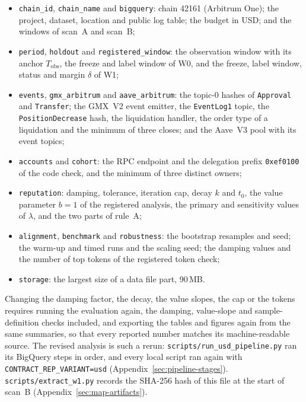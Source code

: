 \begin{itemize}
\item \texttt{chain\_id}, \texttt{chain\_name} and \texttt{bigquery}: chain 42161 (Arbitrum One); the project, dataset, location and public log table; the budget in USD; and the windows of scan~A and scan~B;
\item \texttt{period}, \texttt{holdout} and \texttt{registered\_window}: the observation window with its anchor $T_{\text{obs}}$, the freeze and label window of W0, and the freeze, label window, status and margin $\delta$ of W1;
\item \texttt{events}, \texttt{gmx\_arbitrum} and \texttt{aave\_arbitrum}: the topic-0 hashes of \texttt{Approval} and \texttt{Transfer}; the GMX~V2 event emitter, the \texttt{EventLog1} topic, the \texttt{PositionDecrease} hash, the liquidation handler, the order type of a liquidation and the minimum of three closes; and the Aave~V3 pool with its event topics;
\item \texttt{accounts} and \texttt{cohort}: the RPC endpoint and the delegation prefix \texttt{0xef0100} of the code check, and the minimum of three distinct owners;
\item \texttt{reputation}: damping, tolerance, iteration cap, decay $k$ and $t_0$, the value parameter $b=1$ of the registered analysis, the primary and sensitivity values of $\lambda$, and the two parts of rule~A;
\item \texttt{alignment}, \texttt{benchmark} and \texttt{robustness}: the bootstrap resamples and seed; the warm-up and timed runs and the scaling seed; the damping values and the number of top tokens of the registered token check;
\item \texttt{storage}: the largest size of a data file part, 90\,MB.
\end{itemize}

Changing the damping factor, the decay, the value slopes, the cap or the tokens requires running the evaluation again, the damping, value-slope and sample-definition checks included, and exporting the tables and figures again from the same summaries, so that every reported number matches its machine-readable source. The revised analysis is such a rerun: \texttt{scripts/run\_usd\_pipeline.py} ran its BigQuery steps in order, and every local script ran again with \texttt{CONTRACT\_REP\_VARIANT=usd} (Appendix~\ref{sec:pipeline-stages}). \texttt{scripts/extract\_w1.py} records the SHA-256 hash of this file at the start of scan~B (Appendix~\ref{sec:map-artifacts}).

